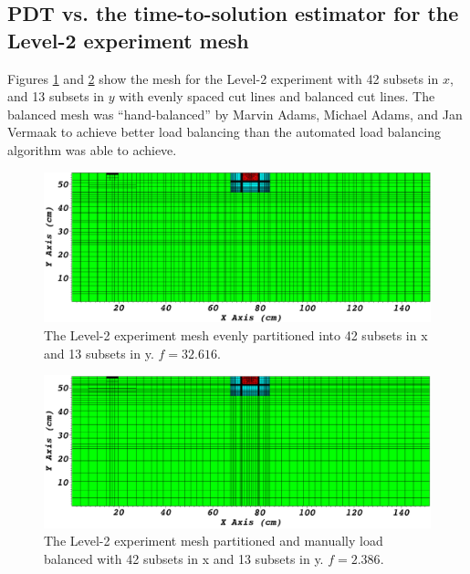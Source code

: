 \subsection{PDT vs. the time-to-solution estimator for the Level-2 experiment mesh}
Figures \ref{level2_42x13} and \ref{level2_42x13_balanced} show the mesh for the Level-2 experiment with 42 subsets in $x$, and 13 subsets in $y$ with evenly spaced cut lines and balanced cut lines.
The balanced mesh was ``hand-balanced'' by Marvin Adams, Michael Adams, and Jan Vermaak to achieve better load balancing than the automated load balancing algorithm was able to achieve.
\begin{figure}[H]
\centering
\includegraphics[scale=0.28]{../../figures/level2_42x13.png}
\caption{The Level-2 experiment mesh evenly partitioned into 42 subsets in x and 13 subsets in y. $f = 32.616$.}
\label{level2_42x13}
\end{figure}
\begin{figure}[H]
\centering
\includegraphics[scale=0.28]{../../figures/level2_42x13_balanced.png}
\caption{The Level-2 experiment mesh partitioned and manually load balanced with 42 subsets in x and 13 subsets in y. $f = 2.386$.}
\label{level2_42x13_balanced}
\end{figure}

